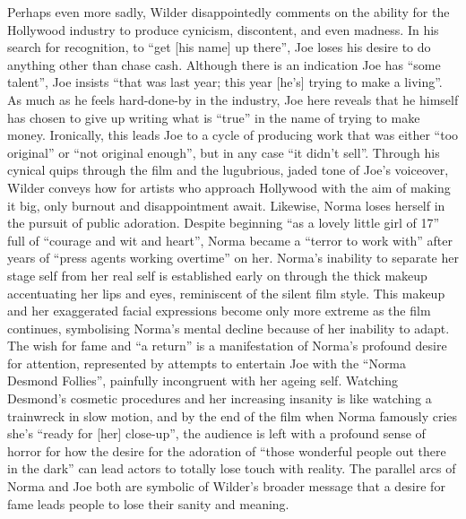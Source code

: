 \documentclass[a4paper]{article}
\begin{document}
Perhaps even more sadly, Wilder disappointedly comments on the ability for the Hollywood industry to produce cynicism, discontent, and even madness. In his search for recognition, to “get [his name] up there”, Joe loses his desire to do anything other than chase cash. Although there is an indication Joe has “some talent”, Joe insists “that was last year; this year [he’s] trying to make a living”. As much as he feels hard-done-by in the industry, Joe here reveals that he himself has chosen to give up writing what is “true” in the name of trying to make money. Ironically, this leads Joe to a cycle of producing work that was either “too original” or “not original enough”, but in any case “it didn’t sell”. Through his cynical quips through the film and the lugubrious, jaded tone of Joe’s voiceover, Wilder conveys how for artists who approach Hollywood with the aim of making it big, only burnout and disappointment await. Likewise, Norma loses herself in the pursuit of public adoration. Despite beginning “as a lovely little girl of 17” full of “courage and wit and heart”, Norma became a “terror to work with” after years of “press agents working overtime” on her. Norma’s inability to separate her stage self from her real self is established early on through the thick makeup accentuating her lips and eyes, reminiscent of the silent film style. This makeup and her exaggerated facial expressions become only more extreme as the film continues, symbolising Norma’s mental decline because of her inability to adapt. The wish for fame and “a return” is a manifestation of Norma’s profound desire for attention, represented by attempts to entertain Joe with the “Norma Desmond Follies”, painfully incongruent with her ageing self. Watching Desmond’s cosmetic procedures and her increasing insanity is like watching a trainwreck in slow motion, and by the end of the film when Norma famously cries she’s “ready for [her] close-up”, the audience is left with a profound sense of horror for how the desire for the adoration of “those wonderful people out there in the dark” can lead actors to totally lose touch with reality. The parallel arcs of Norma and Joe both are symbolic of Wilder’s broader message that a desire for fame leads people to lose their sanity and meaning.
\end{document}
